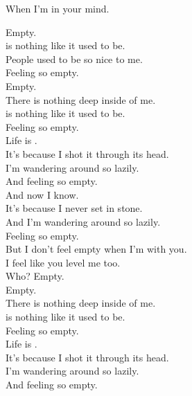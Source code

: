 When I'm in your mind. \\





Empty. \\

 is nothing like it used to be. \\
People used to be so nice to me. \\
Feeling so empty. \\
Empty. \\

There is nothing deep inside of me. \\
 is nothing like it used to be. \\
Feeling so empty. \\

Life is . \\
It's because I shot it through its head. \\
I'm wandering around so lazily. \\
And feeling so empty. \\

And now I know. \\
It's because I never set in stone. \\
And I'm wandering around so lazily. \\
Feeling so empty. \\

But I don't feel empty when I'm with you. \\
I feel like you level me too. \\
Who? Empty. \\
Empty. \\

There is nothing deep inside of me. \\
 is nothing like it used to be. \\
Feeling so empty. \\

Life is . \\
It's because I shot it through its head. \\
I'm wandering around so lazily. \\
And feeling so empty. \\

